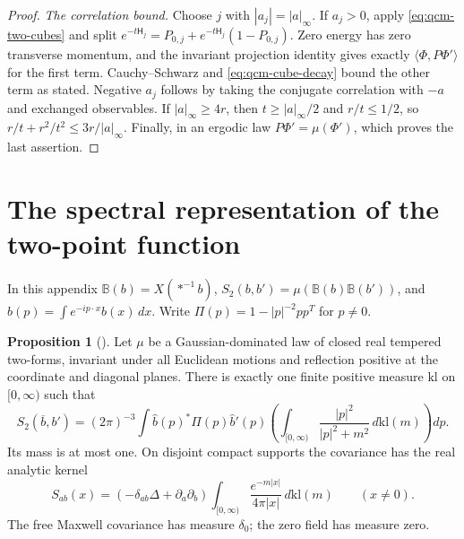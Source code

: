 \documentclass[11pt,letterpaper,reqno]{amsart}
\theoremstyle{definition}
\newtheorem{qcmproposition}{Proposition}[section]
\newenvironment{proposition}[1][]{\pushQED{\qed}\renewcommand{\qedsymbol}{$\blacksquare$}\begin{qcmproposition}[#1]}{\popQED\end{qcmproposition}}
\begin{document}
\begin{proof}
\emph{The correlation bound.}
Choose $j$ with $|a_j|=|a|_\infty$. If $a_j>0$, apply
\eqref{eq:qcm-two-cubes} and split
$e^{-t\mathsf H_j}=P_{0,j}+e^{-t\mathsf H_j}(1-P_{0,j})$.
Zero energy has zero transverse momentum, and the invariant
projection identity gives exactly $\langle\Phi,P\Phi'\rangle$ for
the first term. Cauchy--Schwarz and \eqref{eq:qcm-cube-decay} bound
the other term as stated. Negative $a_j$ follows by taking the
conjugate correlation with $-a$ and exchanged observables.
If $|a|_\infty\ge4r$, then $t\ge|a|_\infty/2$ and $r/t\le1/2$,
so $r/t+r^2/t^2\le3r/|a|_\infty$. Finally, in an ergodic law
$P\Phi'=\mu(\Phi')$, which proves the last assertion.
\end{proof}

\section{The spectral representation of the two-point function}
\label{app:qcm-kallen-lehmann}

In this appendix $\mathbb B(b)=X(*^{-1}b)$,
$S_2(b,b')=\mu(\mathbb B(b)\mathbb B(b'))$, and
$\widehat b(p)=\int e^{-ip\cdot x}b(x)\,dx$.
Write $\Pi(p)=1-|p|^{-2}pp^T$ for $p\ne0$.

\begin{proposition}\label{qcm:kallen-lehmann}
Let $\mu$ be a Gaussian-dominated law of closed real tempered
two-forms, invariant under all Euclidean motions and reflection
positive at the coordinate and diagonal planes. There is exactly one
finite positive measure $\mathrm{kl}$ on $[0,\infty)$ such that
\[
 S_2(\overline b,b')=(2\pi)^{-3}\int
 \widehat b(p)^*\Pi(p)\widehat b'(p)
 \left(\int_{[0,\infty)}\frac{|p|^2}{|p|^2+m^2}\,d\mathrm{kl}(m)\right)dp.
\]
Its mass is at most one. On disjoint compact supports the covariance
has the real analytic kernel
\[
 S_{ab}(x)=(-\delta_{ab}\Delta+\partial_a\partial_b)
       \int_{[0,\infty)}\frac{e^{-m|x|}}{4\pi|x|}\,d\mathrm{kl}(m)
       \qquad(x\ne0).
\]
The free Maxwell covariance has measure $\delta_0$; the zero field has
measure zero.
\end{proposition}
\end{document}
